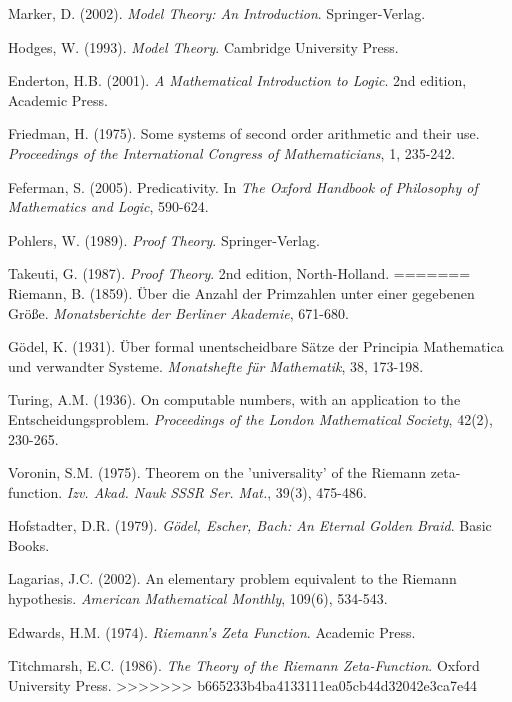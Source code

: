 \documentclass[12pt]{article}
\theoremstyle{plain}
\theoremstyle{definition}
\begin{document}
\begin{thebibliography}{99}
 Marker, D. (2002). \emph{Model Theory: An Introduction}. Springer-Verlag.

 Hodges, W. (1993). \emph{Model Theory}. Cambridge University Press.

 Enderton, H.B. (2001). \emph{A Mathematical Introduction to Logic}. 2nd edition, Academic Press.

 Friedman, H. (1975). Some systems of second order arithmetic and their use. \emph{Proceedings of the International Congress of Mathematicians}, 1, 235-242.

 Feferman, S. (2005). Predicativity. In \emph{The Oxford Handbook of Philosophy of Mathematics and Logic}, 590-624.

 Pohlers, W. (1989). \emph{Proof Theory}. Springer-Verlag.

 Takeuti, G. (1987). \emph{Proof Theory}. 2nd edition, North-Holland.
=======
 Riemann, B. (1859). Über die Anzahl der Primzahlen unter einer gegebenen Größe. \emph{Monatsberichte der Berliner Akademie}, 671-680.

 Gödel, K. (1931). Über formal unentscheidbare Sätze der Principia Mathematica und verwandter Systeme. \emph{Monatshefte für Mathematik}, 38, 173-198.

 Turing, A.M. (1936). On computable numbers, with an application to the Entscheidungsproblem. \emph{Proceedings of the London Mathematical Society}, 42(2), 230-265.

 Voronin, S.M. (1975). Theorem on the 'universality' of the Riemann zeta-function. \emph{Izv. Akad. Nauk SSSR Ser. Mat.}, 39(3), 475-486.

 Hofstadter, D.R. (1979). \emph{Gödel, Escher, Bach: An Eternal Golden Braid}. Basic Books.

 Lagarias, J.C. (2002). An elementary problem equivalent to the Riemann hypothesis. \emph{American Mathematical Monthly}, 109(6), 534-543.

 Edwards, H.M. (1974). \emph{Riemann's Zeta Function}. Academic Press.

 Titchmarsh, E.C. (1986). \emph{The Theory of the Riemann Zeta-Function}. Oxford University Press.
>>>>>>> b665233b4ba4133111ea05cb44d32042e3ca7e44

\end{thebibliography}
\end{document}
